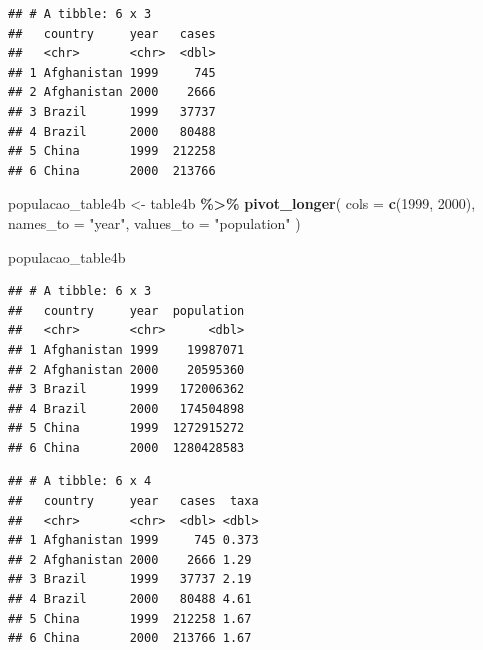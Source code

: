 \documentclass[
]{article}
\newenvironment{Shaded}{\begin{snugshade}}{\end{snugshade}}
\newcommand{\AttributeTok}[1]{\textcolor[rgb]{0.13,0.29,0.53}{#1}}
\newcommand{\DecValTok}[1]{\textcolor[rgb]{0.00,0.00,0.81}{#1}}
\newcommand{\FunctionTok}[1]{\textcolor[rgb]{0.13,0.29,0.53}{\textbf{#1}}}
\newcommand{\NormalTok}[1]{#1}
\newcommand{\OtherTok}[1]{\textcolor[rgb]{0.56,0.35,0.01}{#1}}
\newcommand{\SpecialCharTok}[1]{\textcolor[rgb]{0.81,0.36,0.00}{\textbf{#1}}}
\newcommand{\StringTok}[1]{\textcolor[rgb]{0.31,0.60,0.02}{#1}}
\begin{document}
\begin{verbatim}
## # A tibble: 6 x 3
##   country     year   cases
##   <chr>       <chr>  <dbl>
## 1 Afghanistan 1999     745
## 2 Afghanistan 2000    2666
## 3 Brazil      1999   37737
## 4 Brazil      2000   80488
## 5 China       1999  212258
## 6 China       2000  213766
\end{verbatim}

\begin{Shaded}
\begin{Highlighting}[]
\NormalTok{populacao\_table4b }\OtherTok{\textless{}{-}}\NormalTok{ table4b }\SpecialCharTok{\%\textgreater{}\%}
                      \FunctionTok{pivot\_longer}\NormalTok{(}
                        \AttributeTok{cols =} \FunctionTok{c}\NormalTok{(}\StringTok{\textasciigrave{}}\AttributeTok{1999}\StringTok{\textasciigrave{}}\NormalTok{, }\StringTok{\textasciigrave{}}\AttributeTok{2000}\StringTok{\textasciigrave{}}\NormalTok{),}
                        \AttributeTok{names\_to =} \StringTok{"year"}\NormalTok{,}
                        \AttributeTok{values\_to =} \StringTok{"population"}
\NormalTok{  )}

\NormalTok{populacao\_table4b}
\end{Highlighting}
\end{Shaded}

\begin{verbatim}
## # A tibble: 6 x 3
##   country     year  population
##   <chr>       <chr>      <dbl>
## 1 Afghanistan 1999    19987071
## 2 Afghanistan 2000    20595360
## 3 Brazil      1999   172006362
## 4 Brazil      2000   174504898
## 5 China       1999  1272915272
## 6 China       2000  1280428583
\end{verbatim}

\begin{Shaded}
\end{Shaded}

\begin{verbatim}
## # A tibble: 6 x 4
##   country     year   cases  taxa
##   <chr>       <chr>  <dbl> <dbl>
## 1 Afghanistan 1999     745 0.373
## 2 Afghanistan 2000    2666 1.29 
## 3 Brazil      1999   37737 2.19 
## 4 Brazil      2000   80488 4.61 
## 5 China       1999  212258 1.67 
## 6 China       2000  213766 1.67
\end{verbatim}
\end{document}

